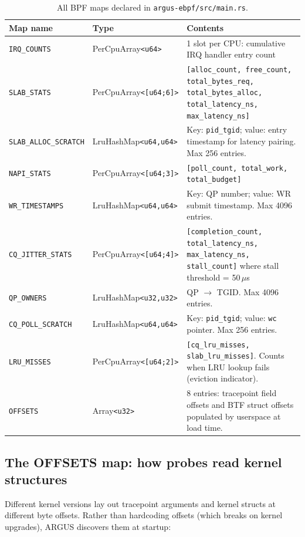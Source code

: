 \documentclass[11pt]{article}
\begin{document}
\begin{table}[h]
\centering
\small
\begin{tabularx}{\textwidth}{p{3.5cm}p{3cm}X}
\toprule
Map name & Type & Contents \\
\midrule
\texttt{IRQ\_COUNTS} & PerCpuArray\texttt{<u64>} & 1 slot per CPU: cumulative IRQ handler entry count \\[2pt]
\texttt{SLAB\_STATS} & PerCpuArray\texttt{<[u64;6]>} & \texttt{[alloc\_count, free\_count, total\_bytes\_req, total\_bytes\_alloc, total\_latency\_ns, max\_latency\_ns]} \\[2pt]
\texttt{SLAB\_ALLOC\_SCRATCH} & LruHashMap\texttt{<u64,u64>} & Key: \texttt{pid\_tgid}; value: entry timestamp for latency pairing. Max 256 entries. \\[2pt]
\texttt{NAPI\_STATS} & PerCpuArray\texttt{<[u64;3]>} & \texttt{[poll\_count, total\_work, total\_budget]} \\[2pt]
\texttt{WR\_TIMESTAMPS} & LruHashMap\texttt{<u64,u64>} & Key: QP number; value: WR submit timestamp. Max 4096 entries. \\[2pt]
\texttt{CQ\_JITTER\_STATS} & PerCpuArray\texttt{<[u64;4]>} & \texttt{[completion\_count, total\_latency\_ns, max\_latency\_ns, stall\_count]} where stall threshold = 50\,$\mu$s \\[2pt]
\texttt{QP\_OWNERS} & LruHashMap\texttt{<u32,u32>} & QP $\rightarrow$ TGID. Max 4096 entries. \\[2pt]
\texttt{CQ\_POLL\_SCRATCH} & LruHashMap\texttt{<u64,u64>} & Key: \texttt{pid\_tgid}; value: \texttt{wc} pointer. Max 256 entries. \\[2pt]
\texttt{LRU\_MISSES} & PerCpuArray\texttt{<[u64;2]>} & \texttt{[cq\_lru\_misses, slab\_lru\_misses]}. Counts when LRU lookup fails (eviction indicator). \\[2pt]
\texttt{OFFSETS} & Array\texttt{<u32>} & 8 entries: tracepoint field offsets and BTF struct offsets populated by userspace at load time. \\
\bottomrule
\end{tabularx}
\caption{All BPF maps declared in \texttt{argus-ebpf/src/main.rs}.}
\end{table}

\subsection{The OFFSETS map: how probes read kernel structures}

Different kernel versions lay out tracepoint arguments and kernel structs at
different byte offsets. Rather than hardcoding offsets (which breaks on
kernel upgrades), ARGUS discovers them at startup:
\end{document}
